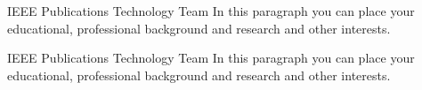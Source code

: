 \documentclass[lettersize,journal]{IEEEtran}
\newcommand*{\template}{template}
\begin{document}
\begin{IEEEbiography}{IEEE Publications Technology Team}
    In this paragraph you can place your educational, professional background and research and other interests.
\end{IEEEbiography}

\begin{IEEEbiography}{IEEE Publications Technology Team}
    In this paragraph you can place your educational, professional background and research and other interests.
\end{IEEEbiography}
\end{document}
